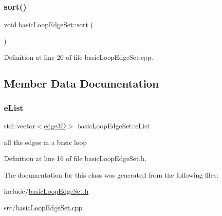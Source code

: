 \subsubsection{\texorpdfstring{sort()}{sort()}}
{\footnotesize\ttfamily void basic\+Loop\+Edge\+Set\+::sort (\begin{DoxyParamCaption}{ }\end{DoxyParamCaption})}



Definition at line 20 of file basic\+Loop\+Edge\+Set.\+cpp.



\subsection{Member Data Documentation}
\mbox{\label{classbasic_loop_edge_set_a30772bbabe3b0b80f3c3dfe7b7ac8c48}} 
\subsubsection{\texorpdfstring{e\+List}{eList}}
{\footnotesize\ttfamily std\+::vector$<$\mbox{\hyperlink{structedge3_d}{edge3D}}$>$ basic\+Loop\+Edge\+Set\+::e\+List}

all the edges in a basic loop 

Definition at line 16 of file basic\+Loop\+Edge\+Set.\+h.



The documentation for this class was generated from the following files\+:\begin{DoxyCompactItemize}
\item 
include/\mbox{\hyperlink{basic_loop_edge_set_8h}{basic\+Loop\+Edge\+Set.\+h}}\item 
src/\mbox{\hyperlink{basic_loop_edge_set_8cpp}{basic\+Loop\+Edge\+Set.\+cpp}}\end{DoxyCompactItemize}
